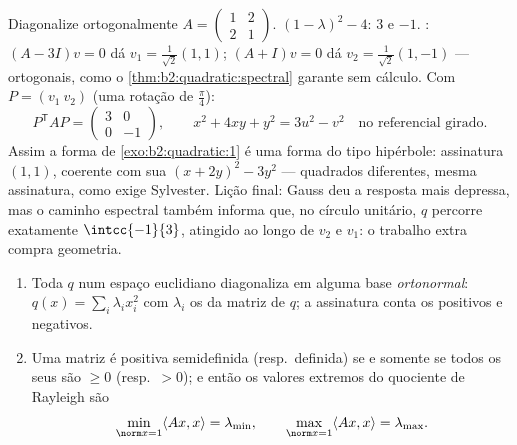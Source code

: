 \begin{example}\label{ex:b2:quadratic:fullrun}
Diagonalize ortogonalmente $A = \begin{pmatrix} 1 & 2\\ 2 &
1\end{pmatrix}$.  $(1 - \lambda)^2 -
4$:  $3$ e $-1$. : $(A - 3I)v = 0$
dá $v_1 = \frac{1}{\sqrt2}(1,1)$; $(A + I)v = 0$ dá $v_2
= \frac{1}{\sqrt2}(1,-1)$ --- ortogonais, como o
\cref{thm:b2:quadratic:spectral} garante sem
cálculo. Com $P = (v_1\ v_2)$ (uma rotação de
$\frac\pi4$):
\[
P^{\mathsf T}AP = \begin{pmatrix} 3 & 0\\ 0 & -1
\end{pmatrix},
\qquad
x^2 + 4xy + y^2 = 3u^2 - v^2
\quad\text{no referencial girado} .
\]
Assim a forma de \cref{exo:b2:quadratic:1} é uma forma do tipo
hipérbole: assinatura $(1,1)$, coerente com sua 
$(x + 2y)^2 - 3y^2$ --- quadrados diferentes, mesma assinatura, como
exige Sylvester. Lição final: Gauss deu a resposta
mais depressa, mas o caminho espectral também informa que, no círculo
unitário, $q$ percorre exatamente $\intcc{-1}{3}$, atingido ao longo de
$v_2$ e $v_1$: o trabalho extra compra geometria.
\end{example}

\begin{corollary}\label{cor:b2:quadratic:principalaxes}
\begin{enumerate}
  \item Toda  $q$ num espaço euclidiano diagonaliza
        em alguma base \emph{ortonormal}: $q(x) = \sum_i \lambda_i
        x_i^2$ com $\lambda_i$ os  da matriz 
        de $q$; a assinatura conta os  positivos e negativos.
  \item Uma matriz  é positiva semidefinida (resp.\
        definida) se e somente se todos os seus  são $\geq 0$ (resp.\ $>
        0$); e então os valores extremos do quociente de Rayleigh
        são
        \[
        \min_{\norm x = 1} \langle Ax, x\rangle = \lambda_{\min},
        \qquad
        \max_{\norm x = 1} \langle Ax, x\rangle = \lambda_{\max} .
        \]
\end{enumerate}
\end{corollary}

